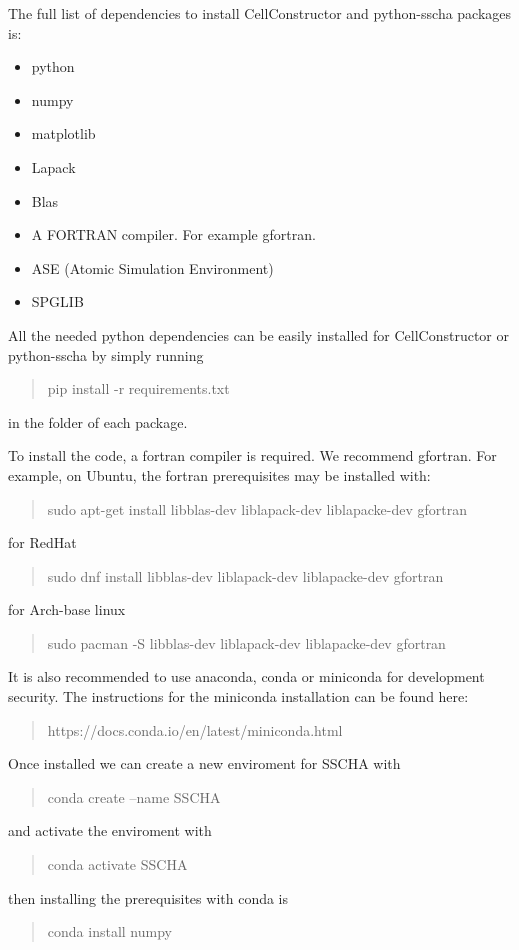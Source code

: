 \documentclass[]{report}
\begin{document}
The full list of dependencies to install CellConstructor and python-sscha packages is:
\begin{itemize}
	\item python
	\item numpy
	\item matplotlib
	\item Lapack
	\item Blas
	\item A FORTRAN compiler. For example gfortran.
	\item ASE (Atomic Simulation Environment)
	\item SPGLIB
\end{itemize}

All the needed python dependencies can be easily installed for CellConstructor or python-sscha by simply running

\begin{quotation}
	pip install -r requirements.txt
\end{quotation}

in the folder of each package.

To install the code, a fortran compiler is required. We recommend gfortran. For example, on Ubuntu, the fortran prerequisites may be installed with:

\begin{quotation}
	sudo apt-get install libblas-dev liblapack-dev liblapacke-dev gfortran
\end{quotation}
for RedHat
\begin{quotation}
	sudo dnf install libblas-dev liblapack-dev liblapacke-dev gfortran 
\end{quotation}
for Arch-base linux
\begin{quotation}
	sudo pacman -S libblas-dev liblapack-dev liblapacke-dev gfortran
\end{quotation}
It is also recommended to use anaconda, conda or miniconda for development security. The instructions for the miniconda installation can be found here:
\begin{quotation}
	https://docs.conda.io/en/latest/miniconda.html
\end{quotation}
Once installed we can create a new enviroment for SSCHA with
\begin{quotation}
	conda create --name SSCHA
\end{quotation}
and activate the enviroment with 
\begin{quotation}
	conda activate SSCHA
\end{quotation}
then installing the prerequisites with conda is
\begin{quotation}
	conda install numpy
\end{quotation}
\end{document}
